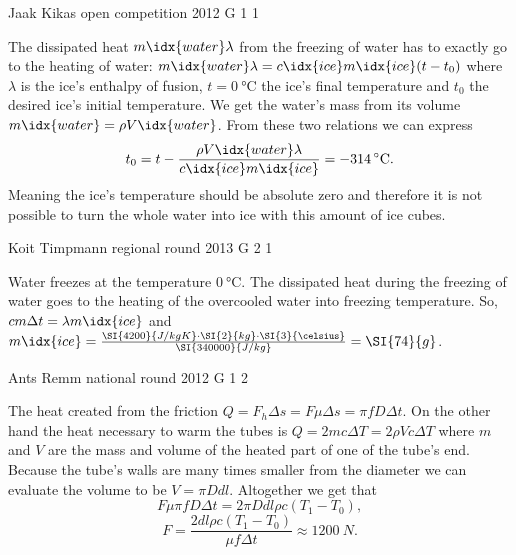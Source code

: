 \documentclass[11pt]{article}
\begin{document}
{Jaak Kikas} %
{open competition} %
{2012} %
{G 1} %
{1} %
{

\ifEngSolution
The dissipated heat $m\idx{water} \lambda$ from the freezing of water has to exactly go to the heating of water: $m\idx{water} \lambda = c\idx{ice} m\idx{ice} (t - t_0)$ where $\lambda$ is the ice’s enthalpy of fusion, $t=\SI{0}{\celsius}$ the ice’s final temperature and $t_0$ the desired ice’s initial temperature. We get the water’s mass from its volume $m\idx{water} = \rho V\idx{water}$. From these two relations we can express
$$t_0 = t - \frac{\rho V\idx{water} \lambda}{c\idx{ice} m\idx{ice}} = -314 \,^{\circ}{\rm C}.$$
Meaning the ice’s temperature should be absolute zero and therefore it is not possible to turn the whole water into ice with this amount of ice cubes.
\fi
}

{Koit Timpmann} %
{regional round} %
{2013} %
{G 2} %
{1} %
{

\ifEngSolution
Water freezes at the temperature $\SI{0}{\celsius}$. The dissipated heat during the freezing of water goes to the heating of the overcooled water into freezing temperature. So, $cm\Delta t = \lambda m\idx{ice}$ and $m\idx{ice}=\frac{\SI{4200}{J / kg K} \cdot \SI{2}{kg} \cdot \SI{3}{\celsius}}{\SI{340000}{J / kg}}=\SI{74}{g}$.
\fi
}

{Ants Remm} %
{national round} %
{2012} %
{G 1} %
{2} %
{

\ifEngSolution
The heat created from the friction $Q = F_h \Delta s = F \mu \Delta s = \pi f D \Delta t$. On the other hand the heat necessary to warm the tubes is $Q = 2 m c \Delta T = 2 \rho V c \Delta T$ where $m$ and $V$ are the mass and volume of the heated part of one of the tube’s end. Because the tube's walls are many times smaller from the diameter we can evaluate the volume to be $V = \pi D d l$. Altogether we get that
\[
F \mu \pi f D \Delta t = 2 \pi D d l \rho c ( T_1 - T_0 ),
\]
\[
F = \frac{2 d l \rho c ( T_1 - T_0 )}{ \mu f \Delta t } \approx \SI{1200}{N}.
\]
\fi
}
\end{document}
